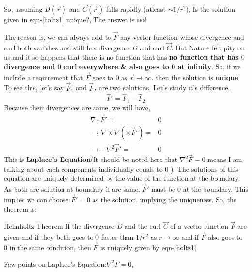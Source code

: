 \documentclass{article}
\begin{document}
So, assuming $D(\vec{r})$ and $\vec{C}(\vec{r})$ falls rapidly (atleast $\sim 1/r^2$), Is the solution given in eqn-\ref{holtz1} unique?, The answer is \textbf{no}!

The reason is, we can always add to $\vec{F}$ any vector function whose divergence and curl both vanishes and still has divergence $D$ and curl $\vec{C}$. But Nature felt pity on us and it so happens that there is no function that has \textbf{no function that has $0$ divergence and $0$ curl everywhere \& also goes to $0$ at infinity}. So, if we include a requirement that $\vec{F}$ goes to $0$ as $\vec{r}\to \infty$, then the solution is \textbf{unique}.\\
To see this, let's say $\vec{F}_1$ and $\vec{F}_2$ are two solutions. Let's study it's difference,
\begin{equation}
    \vec{F}' = \vec{F}_1 - \vec{F}_2
\end{equation}
Because their divergences are same, we will have,
\begin{equation}
    \begin{split}
        \nabla \cdot \vec{F}' =& 0\\
        \to \nabla\times \nabla (\times \vec{F}') =& 0\\
        \to -\nabla^2 \vec{F}' =& 0
    \end{split}
\end{equation}
This is \textbf{Laplace's Equation}(It should be noted here that $\nabla^2\vec{F}=0$ means I am talking about each components individually equals to $0$ ). The solutions of this equation are uniquely determined by the value of the function at the boundary. As both are solution at boundary if are same, $\vec{F}'$ must be $0$ at the boundary. This implies we can choose $\vec{F}'=0$ as the solution, implying the uniqueness.
So, the theorem is:
\begin{theorem}{Helmholtz Theorem}{}
    If the divergence $D$ and the curl $\vec{C}$ of a vector function $\vec{F}$ are given and if they both goes to $0$ faster than $1/r^2$ as $r\to\infty$ and if $\vec{F}$ also goes to $0$ in the same condition, then $\vec{F}$ is uniquely given by eqn-\ref{holtz1}
\end{theorem}
Few points on Laplace's Equation:$\nabla^2 F = 0$,
\end{document}
